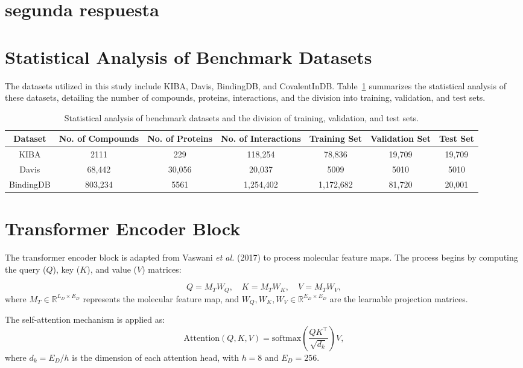 \documentclass{article}
\begin{document}
\section{segunda respuesta}
\section{Statistical Analysis of Benchmark Datasets}
The datasets utilized in this study include KIBA, Davis, BindingDB, and CovalentInDB. Table~\ref{tab:datasets} summarizes the statistical analysis of these datasets, detailing the number of compounds, proteins, interactions, and the division into training, validation, and test sets.

\begin{table}[ht]
	\centering
	\caption{Statistical analysis of benchmark datasets and the division of training, validation, and test sets.}
	\label{tab:datasets}
	\begin{tabular}{ccccccc}
		\toprule
		\textbf{Dataset} & \textbf{No. of Compounds} & \textbf{No. of Proteins} & \textbf{No. of Interactions} & \textbf{Training Set} & \textbf{Validation Set} & \textbf{Test Set} \\
		\midrule
		KIBA       & 2111     & 229    & 118,254   & 78,836  & 19,709 & 19,709 \\
		Davis      & 68,442   & 30,056 & 20,037    & 5009    & 5010   & 5010   \\
		BindingDB  & 803,234  & 5561   & 1,254,402 & 1,172,682 & 81,720 & 20,001 \\
		\bottomrule
	\end{tabular}
\end{table}

\section{Transformer Encoder Block}
The transformer encoder block is adapted from Vaswani \textit{et al.} (2017) to process molecular feature maps. The process begins by computing the query ($Q$), key ($K$), and value ($V$) matrices:

\begin{equation}
	Q = M_T W_Q, \quad K = M_T W_K, \quad V = M_T W_V,
\end{equation}
where $M_T \in \mathbb{R}^{L_D \times E_D}$ represents the molecular feature map, and $W_Q, W_K, W_V \in \mathbb{R}^{E_D \times E_D}$ are the learnable projection matrices.

The self-attention mechanism is applied as:
\begin{equation}
	\text{Attention}(Q, K, V) = \text{softmax}\left(\frac{Q K^\top}{\sqrt{d_k}}\right)V,
\end{equation}
where $d_k = E_D / h$ is the dimension of each attention head, with $h=8$ and $E_D=256$.
\end{document}
